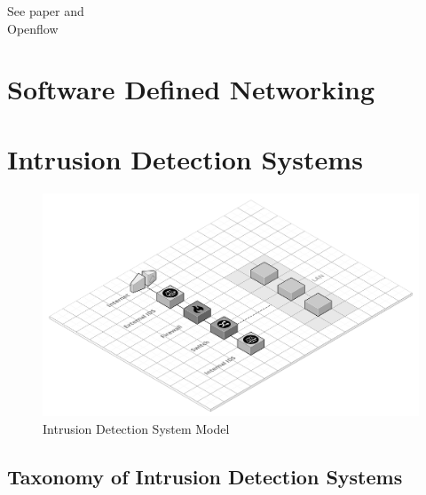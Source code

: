 See paper \cite{Iglesias2015} and  \cite{Velan2016} \\ Openflow

\lipsum


\section{Software Defined Networking}
\label{sec:sdn}

\lipsum


\section{Intrusion Detection Systems}
\label{sec:intrusion-detection-system}

\lipsum[1-5]

    \begin{figure}[h!]
        \centering
        \includegraphics[scale=0.23]{figures/Intrusion Detection System Model.png}
        \caption{Intrusion Detection System Model}
        \label{fig:IDS-model}
    \end{figure}


\subsection{Taxonomy of Intrusion Detection Systems}


